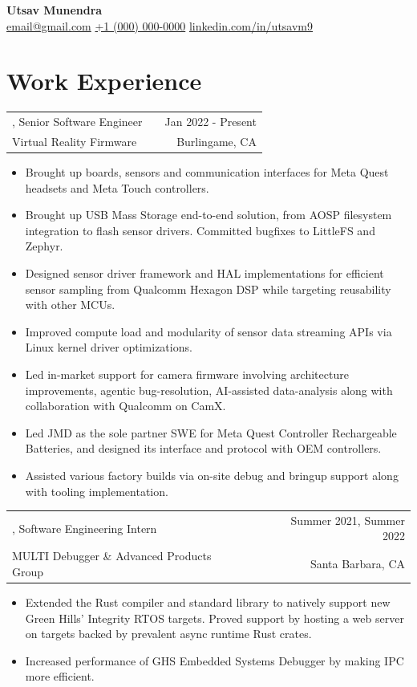 \documentclass[letterpaper,10pt]{article}
\makeatletter
\let\stdtextbf\textbf
\renewcommand{\textbf}[1]{{\fontfamily{bch}\selectfont\stdtextbf{#1}}}
\newlength{\sectiongap}\setlength{\sectiongap}{8pt}
\newlength{\blockgap}\setlength{\blockgap}{6pt}
\newlength{\itemgap}\setlength{\itemgap}{3pt}
\newcommand{\name}[1]{{\fontfamily{bch}\fontsize{32pt}{36pt}\bfseries\selectfont #1}}
\newcommand{\sep}{\quad\textbar\quad}
\newenvironment{jobitem}[5]{%
    \begin{tabularx}{\linewidth}{@{}l X r@{}}
        \textbf{#1}, #2 & & #3 \\[\itemgap]
        #4              & & #5
    \end{tabularx}
    \vspace{-5pt}
    \begin{itemize}
}{%
    \end{itemize}
    \vspace{\blockgap}
}
\makeatother
\begin{document}
\pagestyle{empty}

\begin{center}
    \name{Utsav Munendra}\\[\sectiongap]
    \href{mailto:email@gmail.com}{email@gmail.com}
    \sep
    \href{tel:+10000000000}{+1 (000) 000-0000}
    \sep
    \href{https://linkedin.com/in/utsavm9}{linkedin.com/in/utsavm9}
\end{center}

\section{Work Experience}

\begin{jobitem}{Meta}{Senior Software Engineer}{Jan 2022 - Present}{Virtual Reality Firmware}{Burlingame, CA}
    \item Brought up boards, sensors and communication interfaces for Meta Quest headsets and Meta Touch controllers.
    \item Brought up USB Mass Storage end-to-end solution, from AOSP filesystem integration to flash sensor drivers. Committed bugfixes to LittleFS and Zephyr.
    \item Designed sensor driver framework and HAL implementations for efficient sensor sampling from Qualcomm Hexagon DSP while targeting reusability with other MCUs.
    \item Improved compute load and modularity of sensor data streaming APIs via Linux kernel driver optimizations.
    \item Led in-market support for camera firmware involving architecture improvements, agentic bug-resolution, AI-assisted data-analysis along with collaboration with Qualcomm on CamX.
    \item Led JMD as the sole partner SWE for Meta Quest Controller Rechargeable Batteries, and designed its interface and protocol with OEM controllers.
    \item Assisted various factory builds via on-site debug and bringup support along with tooling implementation.
\end{jobitem}

\begin{jobitem}{Green Hills Software}{Software Engineering Intern}{Summer 2021, Summer 2022}{MULTI Debugger \& Advanced Products Group}{Santa Barbara, CA}
    \item Extended the Rust compiler and standard library to natively support new Green Hills' Integrity RTOS targets. Proved support by hosting a web server on targets backed by prevalent async runtime Rust crates.
    \item Increased performance of GHS Embedded Systems Debugger by making IPC more efficient.
\end{jobitem}
\end{document}
